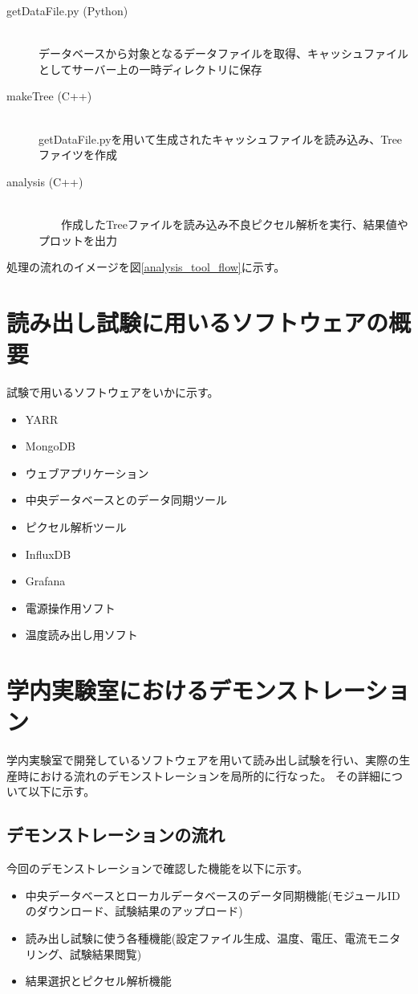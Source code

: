 \begin{description}
  \item[getDataFile.py (Python)]\mbox{}\\ 
    データベースから対象となるデータファイルを取得、キャッシュファイルとしてサーバー上の一時ディレクトリに保存
  \item[makeTree (C++)]\mbox{}\\ 
    getDataFile.pyを用いて生成されたキャッシュファイルを読み込み、Treeファイツを作成
  \item[analysis (C++)]\mbox{}\\ 
　　作成したTreeファイルを読み込み不良ピクセル解析を実行、結果値やプロットを出力
\end{description}

処理の流れのイメージを図\ref{analysis_tool_flow}に示す。

\section{読み出し試験に用いるソフトウェアの概要}
試験で用いるソフトウェアをいかに示す。
\begin{itemize}
  \item YARR
  \item MongoDB
  \item ウェブアプリケーション
  \item 中央データベースとのデータ同期ツール
  \item ピクセル解析ツール
  \item InfluxDB
  \item Grafana
  \item 電源操作用ソフト
  \item 温度読み出し用ソフト
\end{itemize}

\section{学内実験室におけるデモンストレーション}
学内実験室で開発しているソフトウェアを用いて読み出し試験を行い、実際の生産時における流れのデモンストレーションを局所的に行なった。
その詳細について以下に示す。

\subsection{デモンストレーションの流れ}

今回のデモンストレーションで確認した機能を以下に示す。
\begin{itemize}
  \item 中央データベースとローカルデータベースのデータ同期機能(モジュールIDのダウンロード、試験結果のアップロード)
  \item 読み出し試験に使う各種機能(設定ファイル生成、温度、電圧、電流モニタリング、試験結果閲覧)
  \item 結果選択とピクセル解析機能
\end{itemize}

